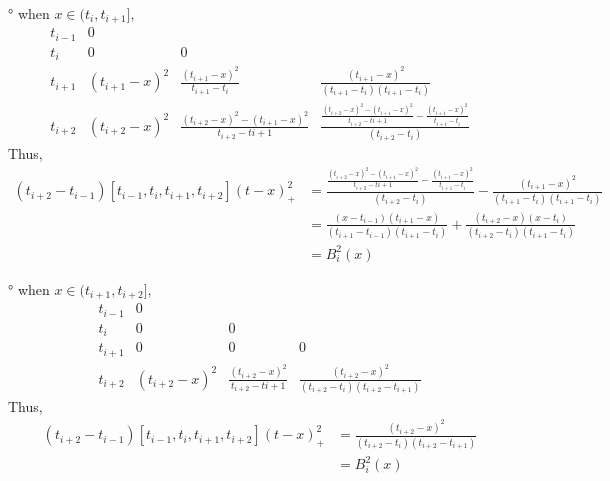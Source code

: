 \documentclass[UTF8]{ctexart}
\begin{document}
° when $x \in (t_{i},t_{i+1}],$
\begin{equation}
    \begin{array}{c|ccc}
    t_{i-1} & 0 & \\
    t_{i} & 0 & 0 & \\
    t_{i+1} & \left(t_{i+1}-x\right)^{2} & \frac{\left(t_{i+1}-x\right)^{2}}{t_{i+1}-t_{i}} & \frac{\left(t_{i+1}-x\right)^{2}}{\left(t_{i+1}-t_{i}\right)\left(t_{i+1}-t_{i}\right)} \\
    t_{i+2} & \left(t_{i+2}-x\right)^{2} & \frac{\left(t_{i+2}-x\right)^{2}-\left(t_{i+1}-x\right)^{2}}{t_{i+2}-t i+1} & \frac{\frac{\left(t_{i+2}-x\right)^{2}-\left(t_{i+1}-x\right)^{2}}{t_{i+2}-t i+1}-\frac{\left(t_{i+1}-x\right)^{2}}{t_{i+1}-t_{i}}}{\left(t_{i+2}-t_{i}\right)}
    \nonumber
    \end{array}
\end{equation}
\noindent Thus,
\begin{equation}
   \begin{aligned}
        \left(t_{i+2}-t_{i-1}\right)\left[t_{i-1}, t_{i}, t_{i+1}, t_{i+2}\right](t-x)_{+}^{2}&=\frac{\frac{\left(t_{i+2}-x\right)^{2}-\left(t_{i+1}-x\right)^{2}}{t_{i+2}-t i+1}-\frac{\left(t_{i+1}-x\right)^{2}}{t_{i+1}-t_{i}}}{\left(t_{i+2}-t_{i}\right)}-\frac{\left(t_{i+1}-x\right)^{2}}{\left(t_{i+1}-t_{i}\right)\left(t_{i+1}-t_{i}\right)}\\ &=\frac{\left(x-t_{i-1}\right)\left(t_{i+1}-x\right)}{\left(t_{i+1}-t_{i-1}\right)\left(t_{i+1}-t_{i}\right)}+ \frac{\left(t_{i+2}-x\right)\left(x-t_{i}\right)}{\left(t_{i+2}-t_{i}\right)\left(t_{i+1}-t_{i}\right)}\\
        &= B_i^2(x)
    \nonumber
   \end{aligned}
\end{equation}

° when $x \in (t_{i+1},t_{i+2}],$
\begin{equation}
    \begin{array}{c|ccc}
    t_{i-1} & 0 & \\
    t_{i} & 0 & 0 & \\
    t_{i+1} & 0 & 0 & 0 \\
    t_{i+2} & \left(t_{i+2}-x\right)^{2} & \frac{\left(t_{i+2}-x\right)^{2}}{t_{i+2}-t i+1} & \frac{\left(t_{i+2}-x\right)^{2}}{\left(t_{i+2}-t_{i}\right)\left(t_{i+2}-t_{i+1}\right)}
    \nonumber
    \end{array}
\end{equation}
\noindent Thus,
\begin{equation}
    \begin{aligned}
        \left(t_{i+2}-t_{i-1}\right)\left[t_{i-1}, t_{i}, t_{i+1}, t_{i+2}\right](t-x)_{+}^{2} &= \frac{\left(t_{i+2}-x\right)^{2}}{\left(t_{i+2}-t_{i}\right)\left(t_{i+2}-t_{i+1}\right)}\\
        &= B_i^2(x)
    \nonumber    
    \end{aligned}
\end{equation}
\end{document}
